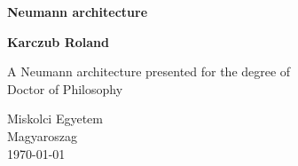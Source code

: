 \documentclass{book}
\begin{document}

\begin{titlepage}
   \begin{center}
       \vspace*{2cm}

       \textbf{Neumann architecture}


       \vspace{2.5cm}

       \textbf{Karczub Roland}

       \vfill
            
       A Neumann architecture presented for the degree of\\
       Doctor of Philosophy
            
       \vspace{1.8cm}
     
            
       
       Miskolci Egyetem\\
       Magyaroszag\\
       \today
            
   \end{center}
\end{titlepage}
\end{document}
